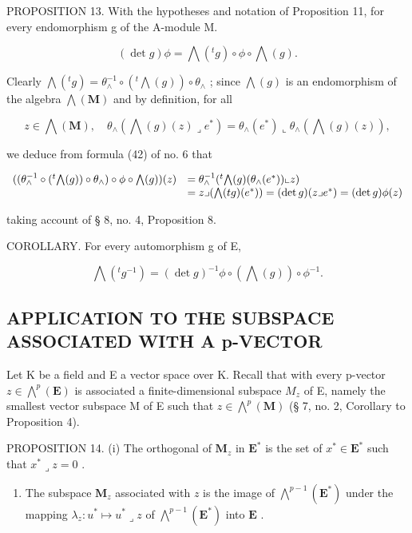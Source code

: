 PROPOSITION 13. With the hypotheses and notation of Proposition 11, for every endomorphism g of the A-module M.

\[
(\det g) \phi = \bigwedge (^ {t} g) \circ \phi \circ \bigwedge (g).\tag{79}
\]

Clearly \(\bigwedge(^{t}g) = \theta_{\wedge}^{-1}\circ (^{t}\bigwedge (g))\circ \theta_{\wedge}\) ; since \(\bigwedge (g)\) is an endomorphism of the algebra \(\bigwedge (\mathbf{M})\) and by definition, for all

\[
z \in \bigwedge (\mathbf {M}), \quad \theta_ {\wedge} (\bigwedge (g) (z) \lrcorner e ^ {*}) = \theta_ {\wedge} (e ^ {*}) \llcorner \theta_ {\wedge} (\bigwedge (g) (z)),
\]

we deduce from formula (42) of no. 6 that

\[
\begin{array}{r l} ((\theta_ {\wedge} ^ {- 1} \circ (^ {t} \bigwedge (g)) \circ \theta_ {\wedge}) \circ \phi \circ \bigwedge (g)) (z) & = \theta_ {\wedge} ^ {- 1} (^ {t} \bigwedge (g) (\theta_ {\wedge} (e ^ {*})) \llcorner z) \\ & = z \lrcorner (\bigwedge (t g) (e ^ {*})) = (\det g) (z \lrcorner e ^ {*}) = (\det g) \phi (z) \end{array}
\]

taking account of § 8, no. 4, Proposition 8.

COROLLARY. For every automorphism g of E,

\[
\bigwedge(^ {t} g ^ {- 1}) = (\det g) ^ {- 1} \phi \circ (\bigwedge (g)) \circ \phi^ {- 1}.\tag{80}
\]

\subsection{APPLICATION TO THE SUBSPACE ASSOCIATED WITH A p-VECTOR}

Let K be a field and E a vector space over K. Recall that with every p-vector \(z \in \bigwedge^{p}(\mathbf{E})\) is associated a finite-dimensional subspace \(M_{z}\) of E, namely the smallest vector subspace M of E such that \(z \in \bigwedge^{p}(\mathbf{M})\) (§ 7, no. 2, Corollary to Proposition 4).

PROPOSITION 14. (i) The orthogonal of \(\mathbf{M}_z\) in \(\mathbf{E}^*\) is the set of \(x^{*}\in \mathbf{E}^{*}\) such that \(x^{*}\lrcorner z = 0\) .

\begin{enumerate}
\def\labelenumi{(\roman{enumi})}
\setcounter{enumi}{1}
\tightlist
\item
  The subspace \(\mathbf{M}_z\) associated with \(z\) is the image of \(\bigwedge^{p-1}(\mathbf{E}^*)\) under the mapping \(\lambda_z: u^* \mapsto u^* \lrcorner z\) of \(\bigwedge^{p-1}(\mathbf{E}^*)\) into \(\mathbf{E}\) .
\end{enumerate}

